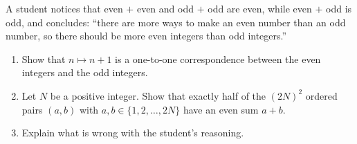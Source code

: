 A student notices that even $+$ even and odd $+$ odd are even, while even $+$ odd is odd, and concludes: ``there are more ways to make an even number than an odd number, so there should be more even integers than odd integers.''
\begin{enumerate}
\item[(a)] Show that $n\mapsto n+1$ is a one-to-one correspondence between the even integers and the odd integers.
\item[(b)] Let $N$ be a positive integer. Show that exactly half of the $(2N)^2$ ordered pairs $(a,b)$ with $a,b\in\{1,2,\dots,2N\}$ have an even sum $a+b$.
\item[(c)] Explain what is wrong with the student's reasoning.
\end{enumerate}
